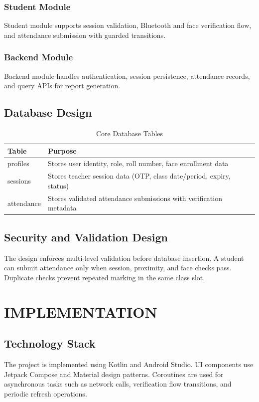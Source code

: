 \documentclass[12pt,a4paper]{report}
\begin{document}
\subsection{Student Module}
Student module supports session validation, Bluetooth and face verification flow, and attendance submission with guarded transitions.

\subsection{Backend Module}
Backend module handles authentication, session persistence, attendance records, and query APIs for report generation.

\section{Database Design}
\begin{table}[H]
\centering
\caption{Core Database Tables}
\begin{tabular}{p{}p{}}
\toprule
\textbf{Table} & \textbf{Purpose} \\
\midrule
profiles & Stores user identity, role, roll number, face enrollment data \\
sessions & Stores teacher session data (OTP, class date/period, expiry, status) \\
attendance & Stores validated attendance submissions with verification metadata \\
\bottomrule
\end{tabular}
\end{table}

\section{Security and Validation Design}
The design enforces multi-level validation before database insertion. A student can submit attendance only when session, proximity, and face checks pass. Duplicate checks prevent repeated marking in the same class slot.

\chapter{IMPLEMENTATION}
\section{Technology Stack}
The project is implemented using Kotlin and Android Studio. UI components use Jetpack Compose and Material design patterns. Coroutines are used for asynchronous tasks such as network calls, verification flow transitions, and periodic refresh operations.
\end{document}
